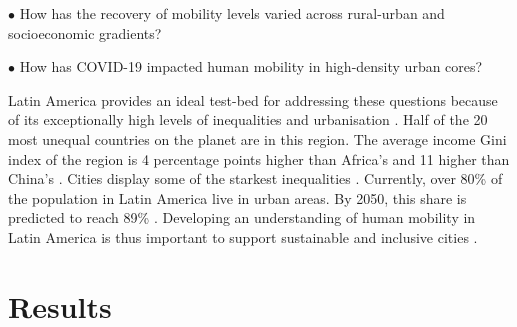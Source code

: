 \documentclass[fleqn,10pt]{wlscirep}
\begin{document}
$\bullet$ How has the recovery of mobility levels varied across rural-urban and socioeconomic gradients?

$\bullet$ How has COVID-19 impacted human mobility in high-density urban cores?

Latin America provides an ideal test-bed for addressing these questions because of its exceptionally high levels of inequalities \cite{de2004inequality, carranza2023wealth} and urbanisation \cite{united2023world}. Half of the 20 most unequal countries on the planet are in this region. The average income Gini index of the region is 4 percentage points higher than Africa's and 11 higher than China's \cite{milanovic2016global}. Cities display some of the starkest inequalities \cite{habitat2022world, bloomberg2025transit}. Currently, over 80\% of the population in Latin America live in urban areas. By 2050, this share is predicted to reach 89\% \cite{habitat2022world}. Developing an understanding of human mobility in Latin America is thus important to support sustainable and inclusive cities \cite{habitat2022world}.


\section*{Results}
\end{document}
